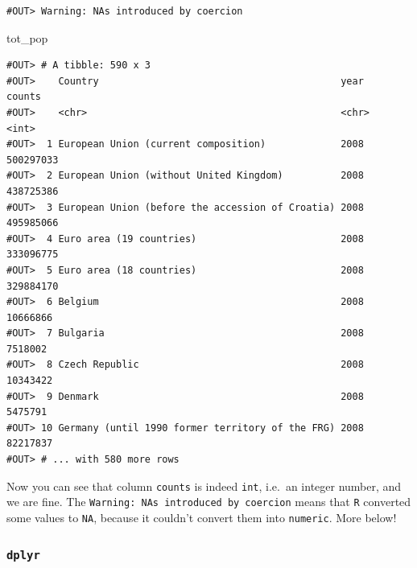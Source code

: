 \documentclass[]{book}
\newenvironment{Shaded}{\begin{snugshade}}{\end{snugshade}}
\newcommand{\KeywordTok}[1]{\textcolor[rgb]{0.13,0.29,0.53}{\textbf{#1}}}
\newcommand{\NormalTok}[1]{#1}
\newcommand{\OperatorTok}[1]{\textcolor[rgb]{0.81,0.36,0.00}{\textbf{#1}}}
\newcommand{\StringTok}[1]{\textcolor[rgb]{0.31,0.60,0.02}{#1}}
\begin{document}
\begin{Shaded}
\end{Shaded}

\begin{verbatim}
#OUT> Warning: NAs introduced by coercion
\end{verbatim}

\begin{Shaded}
\begin{Highlighting}[]
\NormalTok{tot_pop}
\end{Highlighting}
\end{Shaded}

\begin{verbatim}
#OUT> # A tibble: 590 x 3
#OUT>    Country                                          year     counts
#OUT>    <chr>                                            <chr>     <int>
#OUT>  1 European Union (current composition)             2008  500297033
#OUT>  2 European Union (without United Kingdom)          2008  438725386
#OUT>  3 European Union (before the accession of Croatia) 2008  495985066
#OUT>  4 Euro area (19 countries)                         2008  333096775
#OUT>  5 Euro area (18 countries)                         2008  329884170
#OUT>  6 Belgium                                          2008   10666866
#OUT>  7 Bulgaria                                         2008    7518002
#OUT>  8 Czech Republic                                   2008   10343422
#OUT>  9 Denmark                                          2008    5475791
#OUT> 10 Germany (until 1990 former territory of the FRG) 2008   82217837
#OUT> # ... with 580 more rows
\end{verbatim}

Now you can see that column \texttt{counts} is indeed \texttt{int}, i.e.~an integer number, and we are fine. The \texttt{Warning:\ NAs\ introduced\ by\ coercion} means that \texttt{R} converted some values to \texttt{NA}, because it couldn't convert them into \texttt{numeric}. More below!

\hypertarget{dplyr}{%
\subsubsection{\texorpdfstring{\texttt{dplyr}}{dplyr}}\label{dplyr}}
\end{document}
